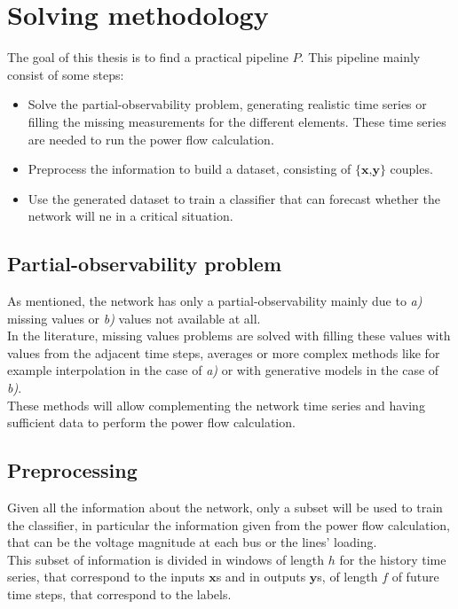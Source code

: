 \section{Solving methodology}
\label{sec:sm}
The goal of this thesis is to find a practical pipeline $P$. This pipeline mainly consist of some steps:
\begin{itemize}
    \item Solve the partial-observability problem, generating realistic time series or filling the missing measurements for the different elements. These time series are needed to run the power flow calculation.
    \item Preprocess the information to build a dataset, consisting of $\{\textbf{x,y}\}$ couples.
    \item Use the generated dataset to train a classifier that can forecast whether the network will ne in a critical situation.
\end{itemize}

\subsection{Partial-observability problem}
As mentioned, the network has only a partial-observability mainly due to \emph{a)} missing values or \emph{b)} values not available at all. \\

In the literature, missing values problems are solved with filling these values with values from the adjacent time steps, averages or more complex methods like for example interpolation in the case of \emph{a)} or with generative models in the case of \emph{b)}. \\

These methods will allow complementing the network time series and having sufficient data to perform the power flow calculation.

\subsection{Preprocessing}
Given all the information about the network, only a subset will be used to train the classifier, in particular the information given from the power flow calculation, that can be the voltage magnitude at each bus or the lines' loading. \\

This subset of information is divided in windows of length $h$ for the history time series, that correspond to the inputs $\textbf{x}$s and in outputs $\textbf{y}$s, of length $f$ of future time steps, that correspond to the labels.

